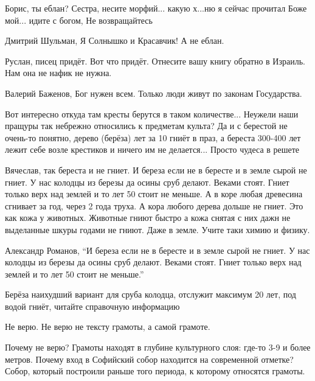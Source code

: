 \begin{itemize}

Борис, ты еблан? Сестра, несите морфий... какую х...ню я сейчас прочитал  Боже мой... идите с богом, Не возвращайтесь


Дмитрий Шульман, Я Солнышко и Красавчик! А не еблан.


Руслан, писец придёт. Вот что придёт. Отнесите вашу книгу обратно в Израиль.
Нам она не нафик не нужна.


Валерий Баженов, Бог нужен всем. Только люди живут по законам Государства.


Вот интересно откуда там кресты берутся в таком количестве... Неужели наши
пращуры так небрежно относились к предметам культа? Да и с берестой не очень-то
понятно, дерево (берёза) лет за 10 гниёт в праз, а береста 300-400 лет лежит
себе возле крестиков и ничего им не делается... Просто чудеса в решете


Вячеслав, так береста и не гниет. И береза если не в бересте и в земле сырой не
гниет. У нас колодцы из березы да осины сруб делают. Веками стоят. Гниет только
верх над землей и то лет 50 стоит не меньше. А в коре любая древесина сгнивает
за год, через 2 года труха. А кора любого дерева дольше не гниет. Это как кожа
у животных. Животные гниют быстро а кожа снятая с них дажн не выделанные шкуры
годами не гниют. Даже в земле. Учите таки химию и физику.


Александр Романов, \enquote{И береза если не в бересте и в земле сырой не гниет. У нас
колодцы из березы да осины сруб делают. Веками стоят. Гниет только верх над
землей и то лет 50 стоит не меньше.}

Берёза наихудший вариант для сруба колодца, отслужит максимум 20 лет, под водой
гниёт, читайте справочную информацию


Не верю. Не верю не тексту грамоты, а самой грамоте.

Почему не верю? Грамоты находят в глубине культурного слоя: где-то 3-9 и более
метров. Почему вход в Софийский собор находится на современной отметке? Собор,
который построили раньше того периода, к которому относятся грамоты.


\end{itemize}
